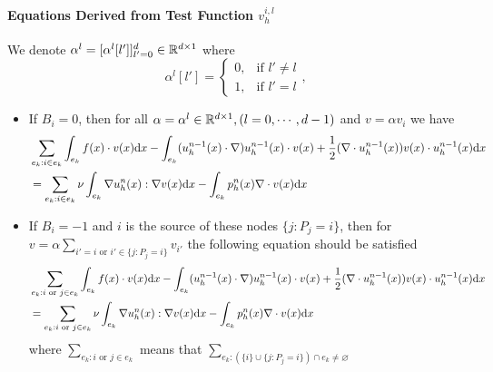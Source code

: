 \paragraph{Equations Derived from Test Function $v_h^{i,l}$}
We denote $\alpha^l=[\alpha^l[l']]_{l'=0}^d\in\mathbb{R}^{d\times1}$ where
\begin{equation}\label{eq:basis-alpha}
  \alpha^l[l']=\left\{
    \begin{array}{ll}
      0, & \text{if } l'\neq l \\
      1, & \text{if } l'=l
    \end{array}\right.,
\end{equation}
\begin{itemize}
  \item If $B_i=0$, then for all $\alpha=\alpha^l\in\mathbb{R}^{d\times1},(l=0,\cdots,d-1)$ and $v=\alpha v_{i}$ we have
    \begin{equation}\label{eq:equation-testv-interior}
      \begin{split}
        &\sum_{e_{k}:i\in e_{k}}\int_{e_{k}}f(x)\cdot v(x)\mathrm{d} x
        -\int_{e_{k}}(u_h^{n-1}(x)\cdot\nabla)u_h^{n-1}(x)\cdot v(x)+\frac{1}{2}(\nabla\cdot u_h^{n-1}(x))v(x)\cdot u_h^{n-1}(x)\mathrm{d} x \\
        &=\sum_{e_{k}:i\in e_{k}}\nu\int_{e_{k}}\nabla u_h^n(x):\nabla v(x)\mathrm{d} x-\int_{e_{k}}p_h^n(x)\nabla\cdot v(x)\mathrm{d} x 
      \end{split}
    \end{equation}
  \item If $B_i=-1$ and $i$ is the source of these nodes $\{j:P_j=i\}$, 
    then for $v=\alpha\sum_{i'=i\text{ or }i'\in\{j:P_j=i\}}v_{i'}$ the following equation should be satisfied
    \begin{equation}\label{eq:equation-testv-period}
      \begin{split}
        &\sum_{e_{k}:i\text{ or }j\in e_{k}}\int_{e_{k}}f(x)\cdot v(x)\mathrm{d} x
        -\int_{e_{k}}(u_h^{n-1}(x)\cdot\nabla)u_h^{n-1}(x)\cdot v(x)+\frac{1}{2}(\nabla\cdot u_h^{n-1}(x))v(x)\cdot u_h^{n-1}(x)\mathrm{d} x \\
        &=\sum_{e_{k}:i\text{ or }j\in e_{k}}\nu\int_{e_{k}}\nabla u_h^n(x):\nabla v(x)\mathrm{d} x-\int_{e_{k}}p_h^n(x)\nabla\cdot v(x)\mathrm{d} x 
      \end{split}
    \end{equation}
    where $\sum_{e_{k}:i\text{ or }j\in e_{k}}$ means that $\sum_{e_k:(\{i\}\cup\{j:P_j=i\})\cap e_k\neq\varnothing}$
\end{itemize}

